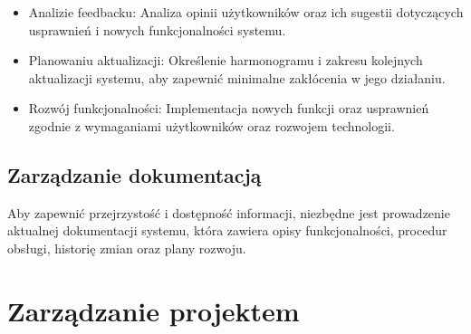 \documentclass[a4paper, 12pt]{article}
\begin{document}
\begin{itemize}
\item Analizie feedbacku: Analiza opinii użytkowników oraz ich sugestii dotyczących usprawnień i nowych funkcjonalności systemu.
\item Planowaniu aktualizacji: Określenie harmonogramu i zakresu kolejnych aktualizacji systemu, aby zapewnić minimalne zakłócenia w jego działaniu.
\item Rozwój funkcjonalności: Implementacja nowych funkcji oraz usprawnień zgodnie z wymaganiami użytkowników oraz rozwojem technologii.
\end{itemize}

\subsection{Zarządzanie dokumentacją}

Aby zapewnić przejrzystość i dostępność informacji, niezbędne jest prowadzenie aktualnej dokumentacji systemu, która zawiera opisy funkcjonalności, procedur obsługi, historię zmian oraz plany rozwoju.
\section{Zarządzanie projektem}
\end{document}
